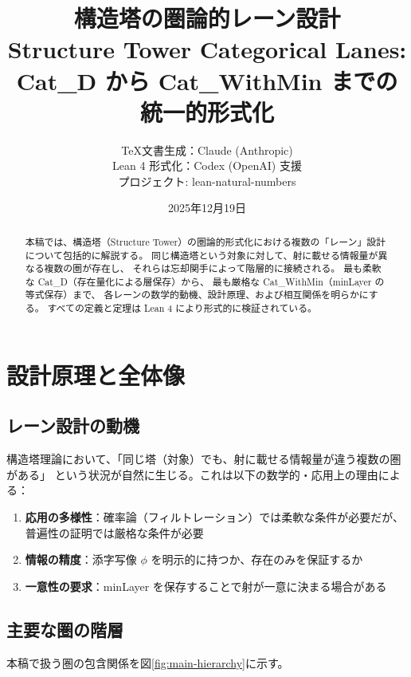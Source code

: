 \documentclass{ltjsarticle}
\title{%
  \Huge 構造塔の圏論的レーン設計\\[0.5em]
  \Large Structure Tower Categorical Lanes:\\
  \large Cat\_D から Cat\_WithMin までの統一的形式化
}
\author{%
  \TeX 文書生成：Claude (Anthropic)\\
  Lean 4 形式化：Codex (OpenAI) 支援\\[1em]
  \small プロジェクト: lean-natural-numbers
}
\date{2025年12月19日}
\theoremstyle{definition}
\begin{document}
\maketitle

\begin{abstract}
本稿では、構造塔（Structure Tower）の圏論的形式化における複数の「レーン」設計について包括的に解説する。
同じ構造塔という対象に対して、射に載せる情報量が異なる複数の圏が存在し、
それらは忘却関手によって階層的に接続される。
最も柔軟な Cat\_D（存在量化による層保存）から、
最も厳格な Cat\_WithMin（minLayer の等式保存）まで、
各レーンの数学的動機、設計原理、および相互関係を明らかにする。
すべての定義と定理は Lean 4 により形式的に検証されている。
\end{abstract}

\tableofcontents
\newpage

\section{設計原理と全体像}

\subsection{レーン設計の動機}

構造塔理論において、「同じ塔（対象）でも、射に載せる情報量が違う複数の圏がある」
という状況が自然に生じる。これは以下の数学的・応用上の理由による：

\begin{enumerate}[label=(\arabic*)]
  \item \textbf{応用の多様性}：確率論（フィルトレーション）では柔軟な条件が必要だが、
        普遍性の証明では厳格な条件が必要
  \item \textbf{情報の精度}：添字写像 $\phi$ を明示的に持つか、存在のみを保証するか
  \item \textbf{一意性の要求}：minLayer を保存することで射が一意に決まる場合がある
\end{enumerate}

\subsection{主要な圏の階層}

本稿で扱う圏の包含関係を図\ref{fig:main-hierarchy}に示す。
\end{document}
